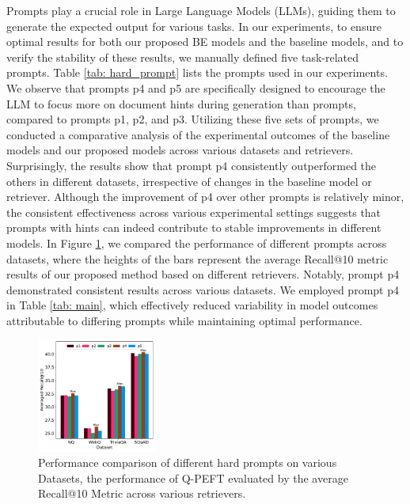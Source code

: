 \documentclass[sigconf,natbib=true,anonymous=false]{acmart}
\begin{document}
Prompts play a crucial role in Large Language Models (LLMs), guiding them to generate the expected output for various tasks. In our experiments, to ensure optimal results for both our proposed BE models and the baseline models, and to verify the stability of these results, we manually defined five task-related prompts. Table \ref{tab: hard_prompt} lists the prompts used in our experiments. We observe that prompts p4 and p5 are specifically designed to encourage the LLM to focus more on document hints during generation than prompts, compared to prompts p1, p2, and p3. Utilizing these five sets of prompts, we conducted a comparative analysis of the experimental outcomes of the baseline models and our proposed models across various datasets and retrievers. Surprisingly, the results show that prompt p4 consistently outperformed the others in different datasets, irrespective of changes in the baseline model or retriever. Although the improvement of p4 over other prompts is relatively minor, the consistent effectiveness across various experimental settings suggests that prompts with hints can indeed contribute to stable improvements in different models. In Figure \ref{fig: upr_prompt}, we compared the performance of different prompts across datasets, where the heights of the bars represent the average Recall@10 metric results of our proposed method based on different retrievers. Notably, prompt p4 demonstrated consistent results across various datasets. We employed prompt p4 in Table \ref{tab: main}, which effectively reduced variability in model outcomes attributable to differing prompts while maintaining optimal performance.


\begin{figure}[t]
\centering
\includegraphics[width=0.35\textwidth]{Figures/upr_different_hard_prompt_bar_multi.pdf}
\caption{Performance comparison of different hard prompts on various Datasets, the performance of Q-PEFT evaluated by the average Recall@10 Metric across various retrievers.}
\label{fig: upr_prompt}
\end{figure}
\end{document}
